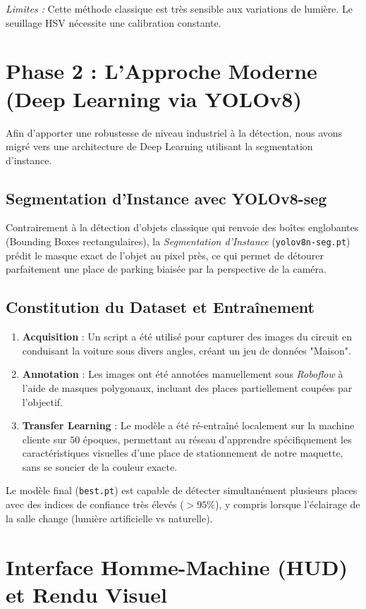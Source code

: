 \documentclass[12pt,a4paper]{article}
\begin{document}
\textit{Limites :} Cette méthode classique est très sensible aux variations de lumière. Le seuillage HSV nécessite une calibration constante.

\section{Phase 2 : L'Approche Moderne (Deep Learning via YOLOv8)}
Afin d'apporter une robustesse de niveau industriel à la détection, nous avons migré vers une architecture de Deep Learning utilisant la segmentation d'instance.

\subsection{Segmentation d'Instance avec YOLOv8-seg}
Contrairement à la détection d'objets classique qui renvoie des boîtes englobantes (Bounding Boxes rectangulaires), la \textit{Segmentation d'Instance} (\texttt{yolov8n-seg.pt}) prédit le masque exact de l'objet au pixel près, ce qui permet de détourer parfaitement une place de parking biaisée par la perspective de la caméra.

\subsection{Constitution du Dataset et Entraînement}
\begin{enumerate}
    \item \textbf{Acquisition} : Un script a été utilisé pour capturer des images du circuit en conduisant la voiture sous divers angles, créant un jeu de données "Maison".
    \item \textbf{Annotation} : Les images ont été annotées manuellement sous \textit{Roboflow} à l'aide de masques polygonaux, incluant des places partiellement coupées par l'objectif.
    \item \textbf{Transfer Learning} : Le modèle a été ré-entraîné localement sur la machine cliente sur $50$ époques, permettant au réseau d'apprendre spécifiquement les caractéristiques visuelles d'une place de stationnement de notre maquette, sans se soucier de la couleur exacte.
\end{enumerate}

Le modèle final (\texttt{best.pt}) est capable de détecter simultanément plusieurs places avec des indices de confiance très élevés ($>95\%$), y compris lorsque l'éclairage de la salle change (lumière artificielle vs naturelle).

\section{Interface Homme-Machine (HUD) et Rendu Visuel}
\end{document}
